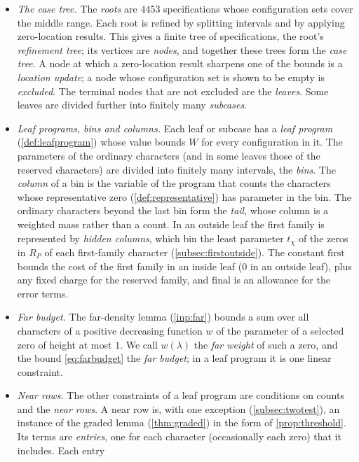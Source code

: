 \documentclass[11pt]{amsart}
\numberwithin{equation}{section}
\theoremstyle{plain}
\theoremstyle{definition}
\theoremstyle{remark}
\newcommand{\1}{\mathbf{1}}
\begin{document}
\begin{itemize}
  \item \emph{The case tree.} The \emph{roots} are $4453$ specifications whose configuration sets
    cover the middle range. Each root is refined by splitting intervals and by applying
    zero-location results. This gives a finite tree of specifications, the root's
    \emph{refinement tree}; its vertices are \emph{nodes}, and together these trees form the
    \emph{case tree}. A node at which a zero-location result sharpens one of the bounds is a
    \emph{location update}; a node whose configuration set is shown to be empty is
    \emph{excluded}. The terminal nodes that are not excluded are the \emph{leaves}. Some leaves
    are divided further into finitely many \emph{subcases}.
  \item \emph{Leaf programs, bins and columns.} Each leaf or subcase has a \emph{leaf program}
    (\cref{def:leafprogram}) whose value bounds $W$ for every configuration in it. The parameters of
    the ordinary characters (and in some leaves those of the reserved characters) are divided into
    finitely many intervals, the \emph{bins}. The \emph{column} of a bin is the variable of the
    program that counts the characters whose representative zero (\cref{def:representative}) has
    parameter in the bin. The ordinary characters beyond the last bin form the \emph{tail}, whose
    column is a weighted mass rather than a count. In an outside leaf the first family is
    represented by \emph{hidden columns}, which bin the least parameter $t_\chi$ of the zeros in $R_P$
    of each first-family character (\cref{subsec:firstoutside}). The constant $\mathrm{first}$
    bounds the cost of the first family in an inside leaf ($0$ in an outside leaf), plus any fixed
    charge for the reserved family, and $\mathrm{final}$ is an allowance for the error terms.
  \item \emph{Far budget.} The far-density lemma (\cref{inp:far}) bounds a sum over all characters
    of a positive decreasing function $w$ of the parameter of a selected zero of height at most
    $1$. We call $w(\lambda)$ the \emph{far weight} of such a zero, and the bound
    \eqref{eq:farbudget} the \emph{far budget}; in a leaf program it is one linear constraint.
  \item \emph{Near rows.} The other constraints of a leaf program are conditions on counts and the
    \emph{near rows}. A near row is, with one exception (\cref{subsec:twotest}), an instance of the
    graded lemma (\cref{thm:graded}) in the form of \cref{prop:threshold}. Its terms are
    \emph{entries}, one for each character (occasionally each zero) that it includes. Each entry

\end{itemize}
\end{document}
